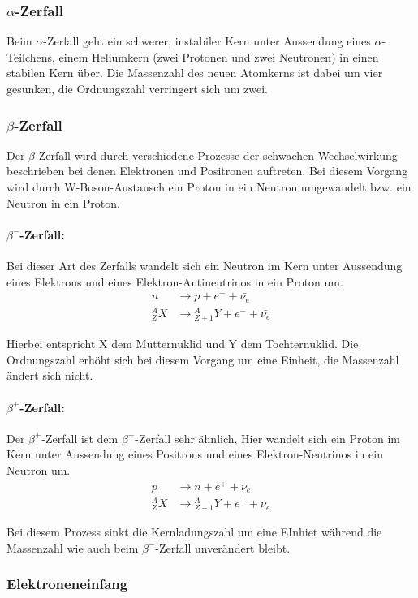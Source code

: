 \documentclass[12pt]{article}
\begin{document}
\subsubsection{$\alpha$-Zerfall}
Beim $\alpha$-Zerfall geht ein schwerer, instabiler Kern unter Aussendung eines $\alpha$-Teilchens, einem Heliumkern (zwei Protonen und zwei Neutronen) in einen stabilen Kern über. Die Massenzahl des neuen Atomkerns ist dabei um vier gesunken, die Ordnungszahl verringert sich um zwei.
\subsubsection{$\beta$-Zerfall}
Der $\beta$-Zerfall wird durch verschiedene Prozesse der schwachen Wechselwirkung beschrieben bei denen Elektronen  und Positronen auftreten. Bei diesem Vorgang wird durch W-Boson-Austausch ein Proton in ein Neutron umgewandelt bzw. ein Neutron in ein Proton.

\paragraph*{$\beta^-$-Zerfall:} 
Bei dieser Art des Zerfalls wandelt sich ein Neutron im Kern unter Aussendung eines Elektrons und eines Elektron-Antineutrinos in ein Proton um. 
\begin{align*}
n &\rightarrow p + e^- + \bar{\nu_e}\\
{}_Z^A X &\rightarrow {}_{Z+1}^A Y + e^- + \bar{\nu_e}
\end{align*}

Hierbei entspricht X dem Mutternuklid und Y dem Tochternuklid. Die Ordnungszahl erhöht sich bei diesem Vorgang um eine Einheit, die Massenzahl ändert sich nicht.

\paragraph*{$\beta^+$-Zerfall:}
Der $\beta^+$-Zerfall ist dem $\beta^-$-Zerfall sehr ähnlich, Hier wandelt sich ein Proton im Kern unter Aussendung eines Positrons und eines Elektron-Neutrinos in ein Neutron um.
\begin{align*}
p &\rightarrow n + e^+ + \nu_e\\
{}_Z^A X &\rightarrow {}_{Z-1}^A Y + e^+ + \nu_e
\end{align*}

Bei diesem Prozess sinkt die Kernladungszahl um eine EInhiet während die Massenzahl wie auch beim $\beta^-$-Zerfall unverändert bleibt.
\subsubsection{Elektroneneinfang}
\end{document}
